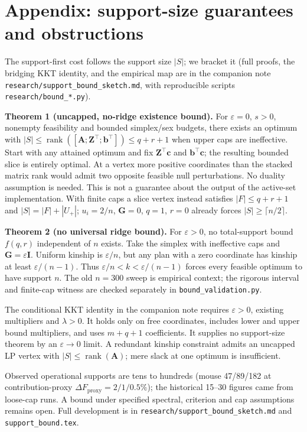 \documentclass[11pt]{article}
\newcommand{\tp}{^{\top}}
\newcommand{\bc}{\mathbf{c}}
\newcommand{\bb}{\mathbf{b}}
\newcommand{\bG}{\mathbf{G}}
\newcommand{\bZ}{\mathbf{Z}}
\newcommand{\bA}{\mathbf{A}}
\begin{document}
\section*{Appendix: support-size guarantees and obstructions}
The support-first cost follows the support size $|S|$; we bracket it (full proofs, the bridging KKT identity, and the empirical map are in the companion note \texttt{research/support\_bound\_sketch.md}, with reproducible scripts \texttt{research/bound\_*.py}).

\textbf{Theorem 1 (uncapped, no-ridge existence bound).} For $\varepsilon=0$, $s>0$, nonempty feasibility and bounded simplex/sex budgets, there exists an optimum with $|S|\le\operatorname{rank}([\bA;\bZ\tp;\bb\tp])\le q+r+1$ when upper caps are ineffective. Start with any attained optimum and fix $\bZ\tp\bc$ and $\bb\tp\bc$; the resulting bounded slice is entirely optimal. At a vertex more positive coordinates than the stacked matrix rank would admit two opposite feasible null perturbations. No duality assumption is needed. This is not a guarantee about the output of the active-set implementation. With finite caps a slice vertex instead satisfies $|F|\le q+r+1$ and $|S|=|F|+|U_+|$; $u_i=2/n$, $\bG=0$, $q=1$, $r=0$ already forces $|S|\ge\lceil n/2\rceil$.

\textbf{Theorem 2 (no universal ridge bound).} For $\varepsilon>0$, no total-support bound $f(q,r)$ independent of $n$ exists. Take the simplex with ineffective caps and $\bG=\varepsilon\mathbf{I}$. Uniform kinship is $\varepsilon/n$, but any plan with a zero coordinate has kinship at least $\varepsilon/(n-1)$. Thus $\varepsilon/n<k<\varepsilon/(n-1)$ forces every feasible optimum to have support $n$. The old $n=300$ sweep is empirical context; the rigorous interval and finite-cap witness are checked separately in \texttt{bound\_validation.py}.

The conditional KKT identity in the companion note requires $\varepsilon>0$, existing multipliers and $\lambda>0$. It holds only on free coordinates, includes lower and upper bound multipliers, and uses $m+q+1$ coefficients. It supplies no support-size theorem by an $\varepsilon\to0$ limit. A redundant kinship constraint admits an uncapped LP vertex with $|S|\le\operatorname{rank}(\bA)$; mere slack at one optimum is insufficient.

Observed operational supports are tens to hundreds (mouse 47/89/182 at contribution-proxy $\Delta F_{\mathrm{proxy}}=2/1/0.5\%$); the historical 15--30 figures came from loose-cap runs. A bound under specified spectral, criterion and cap assumptions remains open. Full development is in \texttt{research/support\_bound\_sketch.md} and \texttt{support\_bound.tex}.
\end{document}
